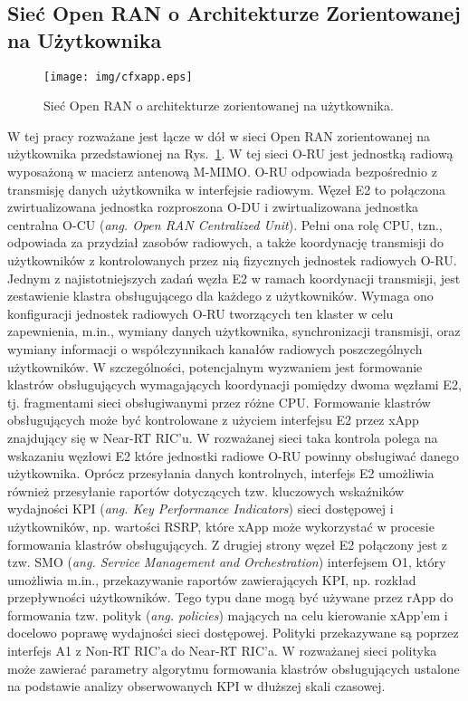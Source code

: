 \documentclass[a4paper]{article}
\begin{document}
\begin{multicols}{2}
\section{Sieć Open RAN o Architekturze Zorientowanej na Użytkownika} \label{sec:system_model}

\begin{figure}[H]
\centering
\texttt{[image: img/cfxapp.eps]}
\caption{Sieć Open RAN o architekturze zorientowanej na użytkownika.}
\label{fig:system_model}
\end{figure}
W tej pracy rozważane jest łącze w dół w sieci Open RAN zorientowanej na użytkownika przedstawionej na Rys.~\ref{fig:system_model}. W tej sieci O-RU jest jednostką radiową wyposażoną w macierz antenową M-MIMO. O-RU odpowiada bezpośrednio z transmisję danych użytkownika w interfejsie radiowym. Węzeł E2 to połączona zwirtualizowana jednostka rozproszona O-DU i zwirtualizowana jednostka centralna O-CU (\textit{ang. Open RAN Centralized Unit}). Pełni ona rolę CPU, tzn., odpowiada za przydział zasobów radiowych, a także koordynację transmisji do użytkowników z kontrolowanych przez nią fizycznych jednostek radiowych O-RU. Jednym z najistotniejszych zadań węzła E2 w ramach koordynacji transmisji, jest zestawienie klastra obsługującego dla każdego z użytkowników. Wymaga ono konfiguracji jednostek radiowych O-RU tworzących ten klaster w celu zapewnienia, m.in., wymiany danych użytkownika, synchronizacji transmisji, oraz wymiany informacji o współczynnikach kanałów radiowych poszczególnych użytkowników. W szczególności, potencjalnym wyzwaniem jest formowanie klastrów obsługujących wymagających koordynacji pomiędzy dwoma węzłami E2, tj. fragmentami sieci obsługiwanymi przez różne CPU. Formowanie klastrów obsługujących może być kontrolowane z użyciem interfejsu E2 przez xApp znajdujący się w Near-RT RIC'u. W rozważanej sieci taka kontrola polega na wskazaniu węzłowi E2 które jednostki radiowe O-RU powinny obsługiwać danego użytkownika. Oprócz przesyłania danych kontrolnych, interfejs E2 umożliwia również przesyłanie raportów dotyczących tzw. kluczowych wskaźników wydajności KPI (\textit{ang. Key Performance Indicators}) sieci dostępowej i użytkowników, np. wartości RSRP, które xApp może wykorzystać w procesie formowania klastrów obsługujących. Z drugiej strony węzeł E2 połączony jest z tzw. SMO (\textit{ang. Service Management and Orchestration}) interfejsem O1, który umożliwia m.in., przekazywanie raportów zawierających KPI, np. rozkład przepływności użytkowników. Tego typu dane mogą być używane przez rApp do formowania tzw. polityk (\textit{ang. policies}) mających na celu kierowanie xApp'em i docelowo poprawę wydajności sieci dostępowej. Polityki przekazywane są poprzez interfejs A1 z Non-RT RIC'a do Near-RT RIC'a. W rozważanej sieci polityka może zawierać parametry algorytmu formowania klastrów obsługujących ustalone na podstawie analizy obserwowanych KPI w dłuższej skali czasowej.


\end{multicols}
\end{document}
